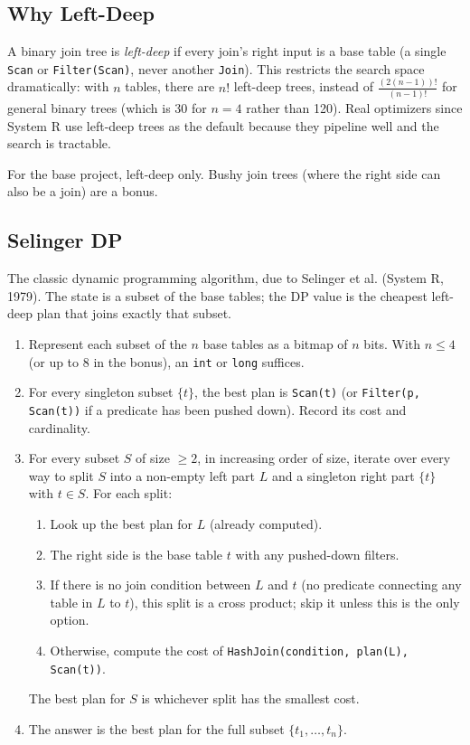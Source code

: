 \documentclass[11pt,a4paper]{article}
\begin{document}
\subsection{Why Left-Deep}
A binary join tree is \textit{left-deep} if every join's right input is a base table (a single \texttt{Scan} or \texttt{Filter(Scan)}, never another \texttt{Join}). This restricts the search space dramatically: with $n$ tables, there are $n!$ left-deep trees, instead of $\frac{(2(n-1))!}{(n-1)!}$ for general binary trees (which is 30 for $n=4$ rather than 120). Real optimizers since System R use left-deep trees as the default because they pipeline well and the search is tractable.

For the base project, left-deep only. Bushy join trees (where the right side can also be a join) are a bonus.

\subsection{Selinger DP}
The classic dynamic programming algorithm, due to Selinger et al. (System R, 1979). The state is a subset of the base tables; the DP value is the cheapest left-deep plan that joins exactly that subset.

\begin{enumerate}
\item Represent each subset of the $n$ base tables as a bitmap of $n$ bits. With $n \leq 4$ (or up to 8 in the bonus), an \texttt{int} or \texttt{long} suffices.

\item For every singleton subset $\{t\}$, the best plan is \texttt{Scan(t)} (or \texttt{Filter(p, Scan(t))} if a predicate has been pushed down). Record its cost and cardinality.

\item For every subset $S$ of size $\geq 2$, in increasing order of size, iterate over every way to split $S$ into a non-empty left part $L$ and a singleton right part $\{t\}$ with $t \in S$. For each split:
\begin{enumerate}
\item Look up the best plan for $L$ (already computed).
\item The right side is the base table $t$ with any pushed-down filters.
\item If there is no join condition between $L$ and $t$ (no predicate connecting any table in $L$ to $t$), this split is a cross product; skip it unless this is the only option.
\item Otherwise, compute the cost of \texttt{HashJoin(condition, plan(L), Scan(t))}.
\end{enumerate}
The best plan for $S$ is whichever split has the smallest cost.

\item The answer is the best plan for the full subset $\{t_1, \ldots, t_n\}$.
\end{enumerate}
\end{document}

